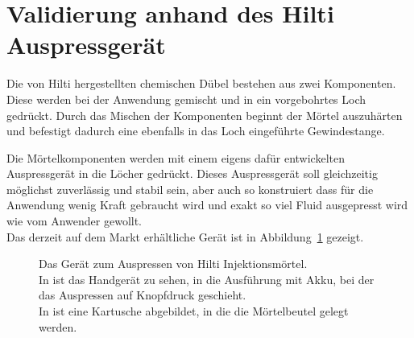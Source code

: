 \section{Validierung anhand des Hilti Auspressgerät}
\label{Kapitel:Auspressgeraet}
Die von Hilti hergestellten chemischen Dübel bestehen aus zwei Komponenten. Diese werden bei der Anwendung gemischt und in ein vorgebohrtes Loch gedrückt. Durch das Mischen der Komponenten beginnt der Mörtel auszuhärten und befestigt dadurch eine ebenfalls in das Loch eingeführte Gewindestange.

Die Mörtelkomponenten werden mit einem eigens dafür entwickelten Auspressgerät in die Löcher gedrückt. Dieses Auspressgerät soll gleichzeitig möglichst zuverlässig und stabil sein, aber auch so konstruiert dass für die Anwendung wenig Kraft gebraucht wird und exakt so viel Fluid ausgepresst wird wie vom Anwender gewollt.\\
Das derzeit auf dem Markt erhältliche Gerät ist in Abbildung~\ref{fig:Auspressgeraet} gezeigt.
%
\begin{figure}[b]
    \centering
    \caption{Das Gerät zum Auspressen von Hilti Injektionsmörtel.\\In {} ist das Handgerät zu sehen, in  die Ausführung mit Akku, bei der das Auspressen auf Knopfdruck geschieht.\\
    In  ist eine Kartusche abgebildet, in die die Mörtelbeutel gelegt werden.}
    \label{fig:Auspressgeraet}
\end{figure}
%

